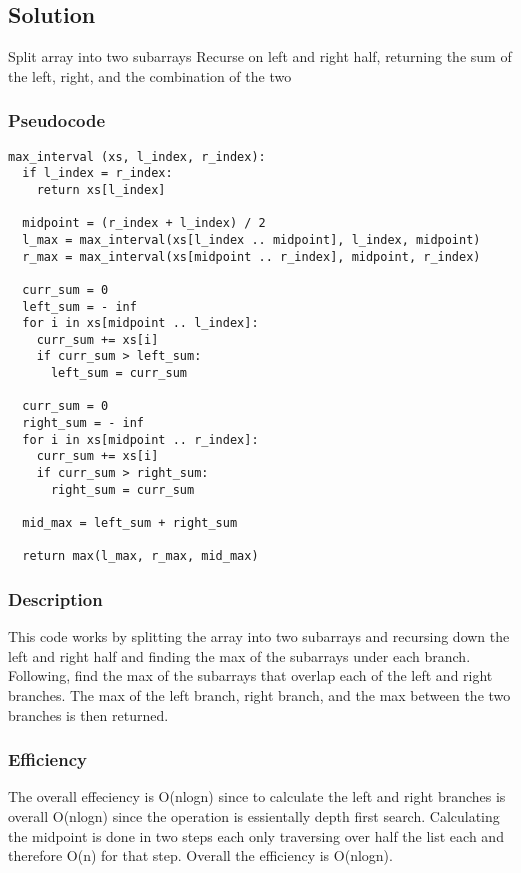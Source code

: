 \subsection*{Solution}

Split array into two subarrays
Recurse on left and right half, returning the sum of the left, right, and the combination of the two

\subsubsection*{Pseudocode}
\begin{verbatim}
max_interval (xs, l_index, r_index):
  if l_index = r_index:
    return xs[l_index]

  midpoint = (r_index + l_index) / 2
  l_max = max_interval(xs[l_index .. midpoint], l_index, midpoint)
  r_max = max_interval(xs[midpoint .. r_index], midpoint, r_index)

  curr_sum = 0
  left_sum = - inf
  for i in xs[midpoint .. l_index]:
    curr_sum += xs[i]
    if curr_sum > left_sum:
      left_sum = curr_sum

  curr_sum = 0
  right_sum = - inf
  for i in xs[midpoint .. r_index]:
    curr_sum += xs[i]
    if curr_sum > right_sum:
      right_sum = curr_sum

  mid_max = left_sum + right_sum

  return max(l_max, r_max, mid_max)
\end{verbatim}

\subsubsection*{Description}
This code works by splitting the array into two subarrays and recursing down the left and right half and finding the max of the subarrays under each branch. Following, find the max of the subarrays that overlap each of the left and right branches. The max of the left branch, right branch, and the max between the two branches is then returned.

\subsubsection*{Efficiency}
The overall effeciency is O(nlogn) since to calculate the left and right branches is overall O(nlogn) since the operation is essientally depth first search. Calculating the midpoint is done in two steps each only traversing over half the list each and therefore O(n) for that step. Overall the efficiency is O(nlogn).
